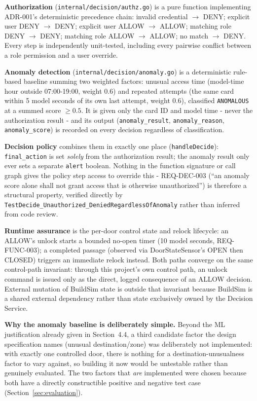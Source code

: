 \documentclass[11pt]{article}
\begin{document}
\textbf{Authorization} (\texttt{internal/decision/authz.go}) is a pure
function implementing ADR-001's deterministic precedence chain: invalid
credential \(\rightarrow\) DENY; explicit user DENY \(\rightarrow\) DENY;
explicit user ALLOW \(\rightarrow\) ALLOW; matching role DENY
\(\rightarrow\) DENY; matching role ALLOW \(\rightarrow\) ALLOW; no match
\(\rightarrow\) DENY. Every step is independently unit-tested, including
every pairwise conflict between a role permission and a user override.

\textbf{Anomaly detection} (\texttt{internal/decision/anomaly.go}) is a
deterministic rule-based baseline summing two weighted factors: unusual
access time (model-time hour outside 07:00-19:00, weight 0.6) and
repeated attempts (the same card within 5 model seconds of its own last
attempt, weight 0.6), classified \texttt{ANOMALOUS} at a summed score
\(\geq 0.5\). It is given only the card ID and model time - never the
authorization result - and its output (\texttt{anomaly\_result},
\texttt{anomaly\_reason}, \texttt{anomaly\_score}) is recorded on every
decision regardless of classification.

\textbf{Decision policy} combines them in exactly one place
(\texttt{handleDecide}): \texttt{final\_action} is set \emph{solely} from
the authorization result; the anomaly result only ever sets a separate
\texttt{alert} boolean. Nothing in the function signature or call graph
gives the policy step access to override this - REQ-DEC-003
(``an anomaly score alone shall not grant access that is otherwise
unauthorized'') is therefore a structural property, verified directly by
\texttt{TestDecide\_Unauthorized\_DeniedRegardlessOfAnomaly} rather than
inferred from code review.

\textbf{Runtime assurance} is the per-door control state and relock
lifecycle: an ALLOW's unlock starts a bounded no-open timer (10 model
seconds, REQ-FUNC-003); a completed passage (observed via
DoorStateSensor's OPEN then CLOSED) triggers an immediate relock instead.
Both paths converge on the same control-path invariant: through this
project's own control path, an unlock command is issued only as the
direct, logged consequence of an ALLOW decision. External mutation of
BuildSim state is outside that invariant because BuildSim is a shared
external dependency rather than state exclusively owned by the Decision
Service.

\textbf{Why the anomaly baseline is deliberately simple.} Beyond the ML
justification already given in Section~4.4, a third candidate factor the
design specification names (unusual destination/zone) was deliberately
not implemented: with exactly one controlled door, there is nothing for a
destination-unusualness factor to vary against, so building it now would
be untestable rather than genuinely evaluated. The two factors that
\emph{are} implemented were chosen because both have a directly
constructible positive and negative test case (Section~\ref{sec:evaluation}).
\end{document}
